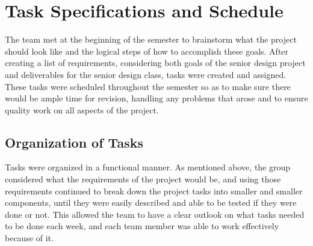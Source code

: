 \documentclass[PPFS.tex]{template/subfiles}
\begin{document}
\begin{comment}
These are the requirements as stated in the template given by Profess M.

    Detailed task specifications are a key part of your design.  Tasks that take more than a day or two should be broken down into sub-tasks whenever possible.  Typically tasks specs and schedule are combined since they are intimately related.  The percentage complete on each task should be included in the PPFS.  Address any issues related to tasks that are behind schedule in the project management section.  Organize tasks hierarchically, such as system architecture, mechanical, electrical (hardware, software), etc.  Provide block diagrams to help explain how you divided the project into various phases/parts/categories.  
    Many teams make the mistake of thinking the prototype is the design.  This is rarely the case.  Only a few teams produce a single device.  Most are designing a product that can be mass produced.  Thus the prototype is your method of validating your production design.   It is a major test or validation activity on the way to completing the design.  Include prototyping activities as tasks that help you finish the production design.  
    Summarize your schedule by reporting the total expected person-hours needed to complete the design.  The best reports track the schedule progress by reporting the month by month estimate of total person-hours and graphing how it changed as you gained experience.
\end{comment}

\section{Task Specifications and Schedule}
The team met at the beginning of the semester to brainstorm what the project should look like and the logical steps of how to accomplish these goals. After creating a list of requirements, considering both goals of the senior design project and deliverables for the senior design class, tasks were created and assigned. These tasks were scheduled throughout the semester so as to make sure there would be ample time for revision, handling any problems that arose and to ensure quality work on all aspects of the project.

\subsection{Organization of Tasks}
Tasks were organized in a functional manner. As mentioned above, the group considered what the requirements of the project would be, and using those requirements continued to break down the project tasks into smaller and smaller components, until they were easily described and able to be tested if they were done or not. This allowed the team to have a clear outlook on what tasks needed to be done each week, and each team member was able to work effectively because of it. 
\end{document}
